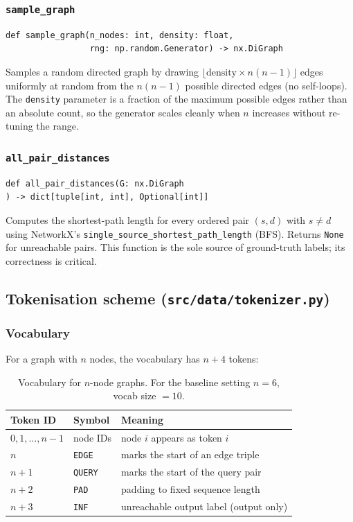 \documentclass[11pt, a4paper]{article}
\begin{document}
\subsubsection{\texttt{sample\_graph}}

\begin{lstlisting}
def sample_graph(n_nodes: int, density: float,
                 rng: np.random.Generator) -> nx.DiGraph
\end{lstlisting}

Samples a random directed graph by drawing
$\lfloor \text{density} \times n(n-1) \rfloor$ edges uniformly at random from
the $n(n-1)$ possible directed edges (no self-loops). The \texttt{density}
parameter is a fraction of the maximum possible edges rather than an absolute
count, so the generator scales cleanly when $n$ increases without re-tuning
the range.

\subsubsection{\texttt{all\_pair\_distances}}

\begin{lstlisting}
def all_pair_distances(G: nx.DiGraph
) -> dict[tuple[int, int], Optional[int]]
\end{lstlisting}

Computes the shortest-path length for every ordered pair $(s, d)$ with
$s \neq d$ using NetworkX's \texttt{single\_source\_shortest\_path\_length}
(BFS). Returns \texttt{None} for unreachable pairs. This function is the sole
source of ground-truth labels; its correctness is critical.

\subsection{Tokenisation scheme (\texttt{src/data/tokenizer.py})}

\subsubsection{Vocabulary}

For a graph with $n$ nodes, the vocabulary has $n + 4$ tokens:

\begin{table}[H]
\centering
\begin{tabular}{@{}lll@{}}
\toprule
Token ID & Symbol & Meaning \\
\midrule
$0, 1, \ldots, n-1$ & node IDs & node $i$ appears as token $i$ \\
$n$                 & \texttt{EDGE}  & marks the start of an edge triple \\
$n+1$               & \texttt{QUERY} & marks the start of the query pair \\
$n+2$               & \texttt{PAD}   & padding to fixed sequence length \\
$n+3$               & \texttt{INF}   & unreachable output label (output only) \\
\bottomrule
\end{tabular}
\caption{Vocabulary for $n$-node graphs. For the baseline setting $n=6$,
  vocab size $= 10$.}
\end{table}
\end{document}
